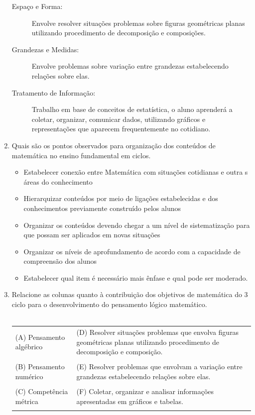 \documentclass[a4paper, 12pt]{article}
\begin{document}
\begin{enumerate}
\begin{description}
   \item[Espaço e Forma:] Envolve resolver situações problemas sobre figuras geométricas planas utilizando procedimento de decomposição e composições.
   \item[Grandezas e Medidas:] Envolve problemas sobre variação entre grandezas estabelecendo relações sobre elas.
   \item[Tratamento de Informação:] Trabalho em base de conceitos de estatística, o aluno aprenderá a coletar, organizar, comunicar dados, utilizando gráficos e representações que aparecem frequentemente no cotidiano.
   \end{description}
 \item Quais são os pontos observados para organização dos conteúdos de matemática no ensino fundamental em ciclos.
   \begin{itemize}
   \item Estabelecer conexão entre Matemática com situações cotidianas e outra s áreas do conhecimento
   \item Hierarquizar conteúdos por meio de ligações estabelecidas e dos conhecimentos previamente construído pelos alunos
   \item Organizar os conteúdos devendo chegar a um nível de sistematização para que possam ser aplicados em novas situações
   \item Organizar os níveis de aprofundamento de acordo com a capacidade de compreensão dos alunos
   \item Estabelecer qual item é necessário mais ênfase e qual pode ser moderado.
   \end{itemize}
\item Relacione as colunas quanto à contribuição dos objetivos de matemática do 3 ciclo para o desenvolvimento do pensamento lógico matemático. \\ \\
  \begin{tabular}{m{5cm} m{5cm}}
    (A) Pensamento algébrico & (D) Resolver situações problemas que envolva figuras geométricas planas utilizando procedimento de decomposição e composição. \\ \\
    (B) Pensamento numérico & (E) Resolver problemas que envolvam a variação entre grandezas estabelecendo relações sobre elas. \\ \\
    (C) Competência métrica & (F) Coletar, organizar e analisar informações apresentadas em gráficos e tabelas. \\ \\

\end{tabular}
\end{enumerate}
\end{document}
